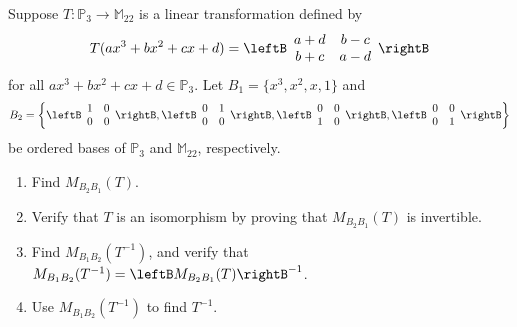 \begin{example}{}{}
Suppose $T:\mathbb{P}_3\to\mathbb{M}_{22}$ is a linear transformation
defined by
\[ T(ax^3+bx^2+cx+d)=
\leftB\begin{array}{cc} a+d & b-c \\ b+c & a-d \end{array}\rightB\]
for all $ax^3+bx^2+cx+d\in\mathbb{P}_3$. Let
$B_1=\{ x^3, x^2, x, 1\}$ and
\[ B_2=\left\{
\leftB\begin{array}{cc} 1 & 0 \\ 0 & 0 \end{array}\rightB,
\leftB\begin{array}{cc} 0 & 1 \\ 0 & 0 \end{array}\rightB,
\leftB\begin{array}{cc} 0 & 0 \\ 1 & 0 \end{array}\rightB,
\leftB\begin{array}{cc} 0 & 0 \\ 0 & 1 \end{array}\rightB\right\}\]
be ordered bases of $\mathbb{P}_3$ and $\mathbb{M}_{22}$, respectively.
\begin{enumerate}
\item Find $M_{B_2B_1}(T)$.
\item Verify that $T$ is an isomorphism by proving that $M_{B_2B_1}(T)$
is invertible.
\item Find $M_{B_1B_2}(T^{-1})$, and verify that 
$M_{B_1B_2}(T^{-1}) = \leftB M_{B_2B_1}(T)\rightB^{-1}$.
\item Use $M_{B_1B_2}(T^{-1})$ to find $T^{-1}$.
\end{enumerate}
\end{example}

